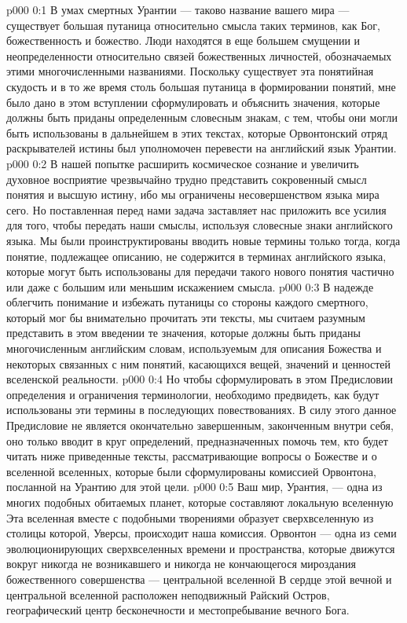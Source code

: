 \uforeword
\author{Божественный Советник}
\vs p000 0:1 В умах смертных Урантии --- таково название вашего мира --- существует большая путаница относительно смысла таких терминов, как Бог, божественность и божество. Люди находятся в еще большем смущении и неопределенности относительно связей божественных личностей, обозначаемых этими многочисленными названиями. Поскольку существует эта понятийная скудость и в то же время столь большая путаница в формировании понятий, мне было дано в этом вступлении сформулировать и объяснить значения, которые должны быть приданы определенным словесным знакам, с тем, чтобы они могли быть использованы в дальнейшем в этих текстах, которые Орвонтонский отряд раскрывателей истины был уполномочен перевести на английский язык Урантии.
\vs p000 0:2 В нашей попытке расширить космическое сознание и увеличить духовное восприятие чрезвычайно трудно представить сокровенный смысл понятия и высшую истину, ибо мы ограничены несовершенством языка мира сего. Но поставленная перед нами задача заставляет нас приложить все усилия для того, чтобы передать наши смыслы, используя словесные знаки английского языка. Мы были проинструктированы вводить новые термины только тогда, когда понятие, подлежащее описанию, не содержится в терминах английского языка, которые могут быть использованы для передачи такого нового понятия частично или даже с большим или меньшим искажением смысла.
\vs p000 0:3 В надежде облегчить понимание и избежать путаницы со стороны каждого смертного, который мог бы внимательно прочитать эти тексты, мы считаем разумным представить в этом введении те значения, которые должны быть приданы многочисленным английским словам, используемым для описания Божества и некоторых связанных с ним понятий, касающихся вещей, значений и ценностей вселенской реальности.
\vs p000 0:4 Но чтобы сформулировать в этом Предисловии определения и ограничения терминологии, необходимо предвидеть, как будут использованы эти термины в последующих повествованиях. В силу этого данное Предисловие не является окончательно завершенным, законченным внутри себя, оно только вводит в круг определений, предназначенных помочь тем, кто будет читать ниже приведенные тексты, рассматривающие вопросы о Божестве и о вселенной вселенных, которые были сформулированы комиссией Орвонтона, посланной на Урантию для этой цели.
\vs p000 0:5 \pc Ваш мир, Урантия, --- одна из многих подобных обитаемых планет, которые составляют локальную вселенную  Эта вселенная вместе с подобными творениями образует сверхвселенную  из столицы которой, Уверсы, происходит наша комиссия. Орвонтон --- одна из семи эволюционирующих сверхвселенных времени и пространства, которые движутся вокруг никогда не возникавшего и никогда не кончающегося мироздания божественного совершенства --- центральной вселенной  В сердце этой вечной и центральной вселенной расположен неподвижный Райский Остров, географический центр бесконечности и местопребывание вечного Бога.
